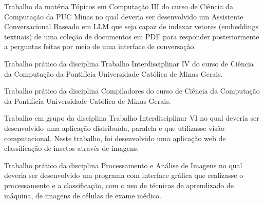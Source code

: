 
Trabalho da matéria Tópicos em Computação III do curso de Ciência da Computação da PUC Minas no qual deveria ser desenvolvido um Assistente Conversacional Baseado em LLM que seja capaz de indexar vetores (embeddings textuais) de uma coleção de documentos em PDF para responder posteriormente a perguntas feitas por meio de uma interface de conversação.\\
\divider

Trabalho prático da disciplina Trabalho Interdisciplinar IV do curso de Ciência da Computação da Pontifícia Universidade Católica de Minas Gerais.\\
\divider

Trabalho prático da disciplina Compiladores do curso de Ciência da Computação da Pontifícia Universidade Católica de Minas Gerais.\\
\divider

Trabalho em grupo da disciplina Trabalho Interdisciplinar VI no qual deveria ser desenvolvido uma aplicação distribuída, paralela e que utilizasse visão computacional. Neste trabalho, foi desenvolvido uma aplicação web de classificação de insetos através de imagens.\\
\divider

Trabalho prático da disciplina Processamento e Análise de Imagens no qual deveria ser desenvolvido um programa com interface gráfica que realizasse o processamento e a classificação, com o uso de técnicas de aprendizado de máquina, de imagens de células de exame médico.\\
\divider

